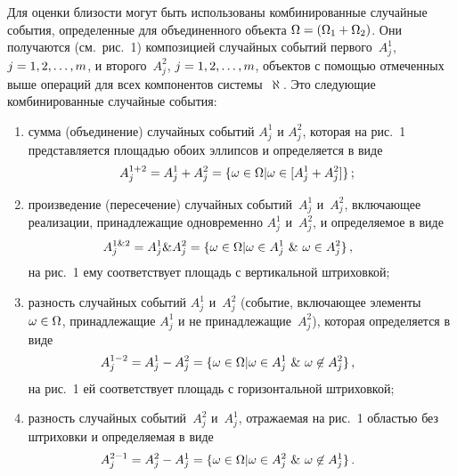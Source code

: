 \begin{multicols}{2}
  Для оценки близости могут быть использованы комбинированные случайные
события, определенные для объединенного объекта $\Omega\hm=
(\Omega_1+\Omega_2)$. Они получаются (см.\ рис.~1) композицией случайных
событий первого~$A_j^1$, $j\hm=1, 2, \ldots , m$, и второго~$A_j^2$, $j\hm=1,
2, \ldots , m$, объектов с помощью отмеченных выше операций для всех
компонентов системы~$\aleph$. Это следующие комбинированные случайные
события:
  \begin{enumerate}[(1)]
\item сумма (объединение) случайных событий $A_j^1$ и $A_j^2$, которая на
рис.~1 представляется пло\-щадью обоих эллипсов и определя\-ет\-ся в виде
\renewcommand{\theequation}{\arabic{equation}a}
\begin{equation}
\hspace*{-3mm}A_j^{1+2} =A_j^1+A_j^2 =\{\omega\in \Omega \vert \omega\in [A_j^1+A_j^2]\}\,;
\label{e13a-kuz}
\end{equation}
\item произведение (пересечение) случайных событий~$A_j^1$ и~$A_j^2$,
включающее реализации, принадлежащие одновременно $A_j^1$
и~$A_j^2$, и опреде\-ля\-емое в виде
\setcounter{equation}{10}
\renewcommand{\theequation}{\arabic{equation}{б}}
\begin{equation}
\hspace*{-8mm}A_j^{1\&2} =A_j^1\&A_j^2 =\{ \omega\in\Omega \vert\omega \in A_j^1\ \&\
\omega \in A_j^2\}\,,
\label{e13b-kuz}
\end{equation}
на рис.~1 ему соответствует площадь с вертикальной штриховкой;
\item разность случайных событий $A_j^1$ и~$A_j^2$ (событие, включающее
элементы $\omega\hm\in \Omega$, принадлежащие $A_j^1$ и не
принадлежащие~$A_j^2$), которая определяется в виде
\setcounter{equation}{10}
\renewcommand{\theequation}{\arabic{equation}в}
\begin{equation}
\hspace*{-8mm}A_j^{1-2} =A_j^1-A_j^2 =\{ \omega\in \Omega \vert \omega \in
A_j^1\ \&\ \omega\not\in A_j^2\}\,,
\label{e13c-kuz}
\end{equation}
на рис.~1 ей соответствует площадь с горизонтальной штриховкой;
\item разность случайных событий~$A_j^2$ и~$A_j^1$, отражаемая на
рис.~1 областью без штриховки и определяемая в виде
\setcounter{equation}{10}
\renewcommand{\theequation}{\arabic{equation}г}
\begin{equation}
\hspace*{-8mm}A_j^{2-1} =A_j^2 -A_j^1 = \{ \omega \in \Omega \vert \omega\in A_j^2\ \&\
\omega\not\in A_j^1\}\,.
\label{e13d-kuz}
\end{equation}
  \end{enumerate}


\end{multicols}
